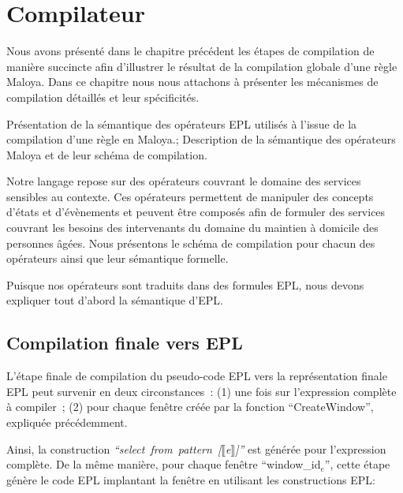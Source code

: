 \chapter{Compilateur}
\begin{preamble}
Nous avons présenté dans le chapitre précédent les étapes de 
compilation de manière succincte afin d'illustrer le résultat 
de la compilation globale d'une règle Maloya. Dans ce chapitre 
nous nous attachons à présenter les mécanismes de compilation 
détaillés et leur spécificités.
\end{preamble}
{
Présentation de la sémantique des opérateurs EPL utilisés à l'issue de la compilation d'une règle en Maloya.;
Description de la sémantique des opérateurs Maloya et de leur schéma de compilation.
}

Notre langage repose sur des opérateurs couvrant le domaine des services sensibles au contexte. Ces opérateurs permettent de manipuler des concepts d'états et d'évènements et peuvent être composés afin de formuler des services couvrant les besoins des intervenants du domaine du maintien à domicile des personnes âgées.
Nous présentons le schéma de compilation pour chacun des opérateurs ainsi que leur sémantique formelle.

Puisque nos opérateurs sont traduits dans des formules EPL, nous devons expliquer tout d'abord la sémantique d'EPL.





\section{Compilation finale vers EPL}
L'étape finale de compilation du pseudo-code EPL vers la représentation finale EPL peut survenir en deux circonstances~: (1) une fois sur l'expression complète à compiler~;
(2) pour chaque fenêtre créée par la fonction ``CreateWindow'', expliquée précédemment. 

Ainsi, la construction 
{\em ``select~from~pattern~[$\llbracket$e$\rrbracket$]''} est générée pour l'expression complète.
De la même manière, pour chaque fenêtre ``window\_id$_e$'', cette étape génère le code EPL implantant la fenêtre en utilisant les constructions EPL: %

